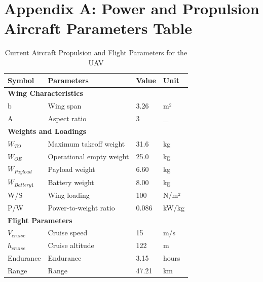 \documentclass[12pt]{article}
\begin{document}
		\section*{Appendix A: Power and Propulsion Aircraft Parameters Table}
		\begin{table}[h!]
			\centering
				\caption{Current Aircraft Propulsion and Flight Parameters for the UAV }
			\begin{tabular}{|l|l|l|l|}
				\hline
				\textbf{Symbol}    & \textbf{Parameters}                  & \textbf{Value}    & \textbf{Unit} \\ \hline
				\multicolumn{4}{|l|}{\textbf{Wing Characteristics}}                                                        \\ \hline
				
				b                 & Wing span                             & 3.26              & m²            \\ \hline
				A                 & Aspect ratio                          & 3                 & \_             \\ \hline
				\multicolumn{4}{|l|}{\textbf{Weights and Loadings}}                                                          \\ \hline
				$W_{TO}$            & Maximum takeoff weight                & 31.6              & kg            \\ \hline
				$W_{OE}$            & Operational empty weight              & 25.0              & kg            \\ \hline
				$W_{Payload}$       & Payload weight                        & 6.60              & kg            \\ \hline
				$W_{Battery1}$      & Battery weight 					       & 8.00              & kg            \\ \hline
				W/S               & Wing loading                          & 100               & N/m²          \\ \hline
				P/W               & Power-to-weight ratio                 & 0.086             & kW/kg         \\ \hline
				\multicolumn{4}{|l|}{\textbf{Flight Parameters}}                                                           \\ \hline
				$V_{cruise}$        & Cruise speed                          & 15         & m/s           \\ \hline
				$h_{cruise}$        & Cruise altitude                       & 122               & m             \\ \hline
				Endurance         & Endurance                             & 3.15              & hours         \\ \hline
				Range             & Range                                 & 47.21             & km            \\ \hline
			\end{tabular}

		\end{table}


		
	
\end{document}
